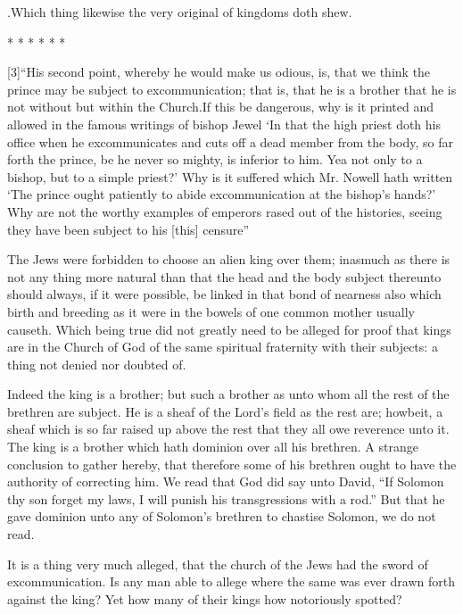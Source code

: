 .Which thing likewise the very original of kingdoms doth shew.


* * * * * *

[3]“His second point, whereby he would make us odious, is, that we think the prince may be subject to excommunication; that is, that he is a brother that he is not without but within the Church.If this be dangerous, why is it printed and allowed in the famous writings of bishop Jewel ‘In that the high priest doth his office when he excommunicates and cuts off a dead member from the body, so far forth the prince, be he never so mighty, is inferior to him. Yea not only to a bishop, but to a simple priest?’ Why is it suffered which Mr. Nowell hath written ‘The prince ought patiently to abide excommunication at the bishop’s hands?’ Why are not the worthy examples of emperors rased out of the histories, seeing they have been subject to his [this] censure”


The Jews were forbidden to choose an alien king over them; inasmuch as there is not any thing more natural than that the head and the body subject thereunto should always, if it were possible, be linked in that bond of nearness also which birth and breeding as it were in the bowels of one common mother usually causeth. Which being true did not greatly need to be alleged for proof that kings are in the Church of God of the same spiritual fraternity with their subjects: a thing not denied nor doubted of.

Indeed the king is a brother; but such a brother as unto whom all the rest of the brethren are subject. He is a sheaf of the Lord’s field as the rest are; howbeit, a sheaf which is so far raised up above the rest that they all owe reverence unto it. The king is a brother which hath dominion over all his brethren. A strange conclusion to gather hereby, that therefore some of his brethren ought to have the authority of correcting him. We read that God did say unto David, “If Solomon thy son forget my laws, I will punish his transgressions with a rod.” But that he gave dominion unto any of Solomon’s brethren to chastise Solomon, we do not read.

It is a thing very much alleged, that the church of the Jews had the sword of excommunication. Is any man able to allege where the same was ever drawn forth against the king? Yet how many of their kings how notoriously spotted?


